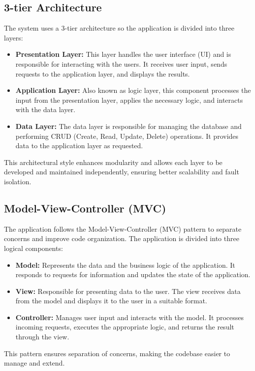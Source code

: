 \subsection{3-tier Architecture}
The system uses a 3-tier architecture so the application is divided into three layers:
\begin{itemize}
    \item \textbf{Presentation Layer:} This layer handles the user interface (UI) and is responsible for interacting with the users. It receives user input, sends requests to the application layer, and displays the results.
    \item \textbf{Application Layer:} Also known as logic layer, this component processes the input from the presentation layer, applies the necessary logic, and interacts with the data layer.
    \item \textbf{Data Layer:} The data layer is responsible for managing the database and performing CRUD (Create, Read, Update, Delete) operations. It provides data to the application layer as requested.
\end{itemize}
This architectural style enhances modularity and allows each layer to be developed and maintained independently, ensuring better scalability and fault isolation.

\subsection{Model-View-Controller (MVC)}
The application follows the Model-View-Controller (MVC) pattern to separate concerns and improve code organization. The application is divided into three logical components:
\begin{itemize}
    \item \textbf{Model:} Represents the data and the business logic of the application. It responds to requests for information and updates the state of the application.
    \item \textbf{View:} Responsible for presenting data to the user. The view receives data from the model and displays it to the user in a suitable format.
    \item \textbf{Controller:} Manages user input and interacts with the model. It processes incoming requests, executes the appropriate logic, and returns the result through the view.
\end{itemize}
This pattern ensures separation of concerns, making the codebase easier to manage and extend.

